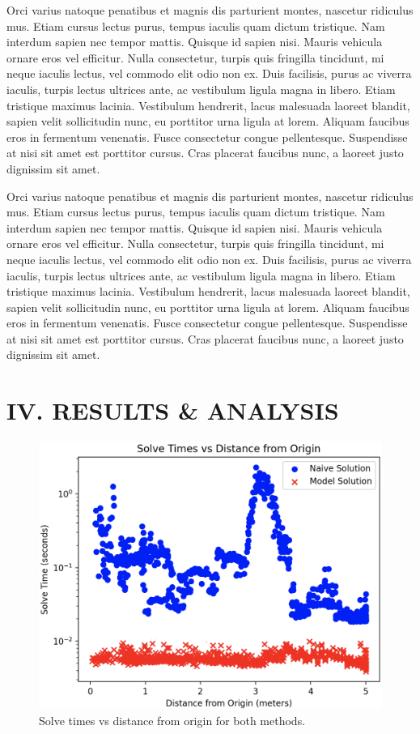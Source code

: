 \documentclass[
	letterpaper, %
	10pt, %
	unnumberedsections, %
	twoside, %
]{LTJournalArticle}
\begin{document}
Orci varius natoque penatibus et magnis dis parturient montes, nascetur ridiculus mus. Etiam cursus lectus purus, tempus iaculis quam dictum tristique. Nam interdum sapien nec tempor mattis. Quisque id sapien nisi. Mauris vehicula ornare eros vel efficitur. Nulla consectetur, turpis quis fringilla tincidunt, mi neque iaculis lectus, vel commodo elit odio non ex. Duis facilisis, purus ac viverra iaculis, turpis lectus ultrices ante, ac vestibulum ligula magna in libero. Etiam tristique maximus lacinia. Vestibulum hendrerit, lacus malesuada laoreet blandit, sapien velit sollicitudin nunc, eu porttitor urna ligula at lorem. Aliquam faucibus eros in fermentum venenatis. Fusce consectetur congue pellentesque. Suspendisse at nisi sit amet est porttitor cursus. Cras placerat faucibus nunc, a laoreet justo dignissim sit amet.

Orci varius natoque penatibus et magnis dis parturient montes, nascetur ridiculus mus. Etiam cursus lectus purus, tempus iaculis quam dictum tristique. Nam interdum sapien nec tempor mattis. Quisque id sapien nisi. Mauris vehicula ornare eros vel efficitur. Nulla consectetur, turpis quis fringilla tincidunt, mi neque iaculis lectus, vel commodo elit odio non ex. Duis facilisis, purus ac viverra iaculis, turpis lectus ultrices ante, ac vestibulum ligula magna in libero. Etiam tristique maximus lacinia. Vestibulum hendrerit, lacus malesuada laoreet blandit, sapien velit sollicitudin nunc, eu porttitor urna ligula at lorem. Aliquam faucibus eros in fermentum venenatis. Fusce consectetur congue pellentesque. Suspendisse at nisi sit amet est porttitor cursus. Cras placerat faucibus nunc, a laoreet justo dignissim sit amet.


\section{IV. RESULTS \& ANALYSIS}

\begin{figure}
	\includegraphics[width=\linewidth]{graph.png}
	\caption{Solve times vs distance from origin for both methods.}
\end{figure}
\end{document}

